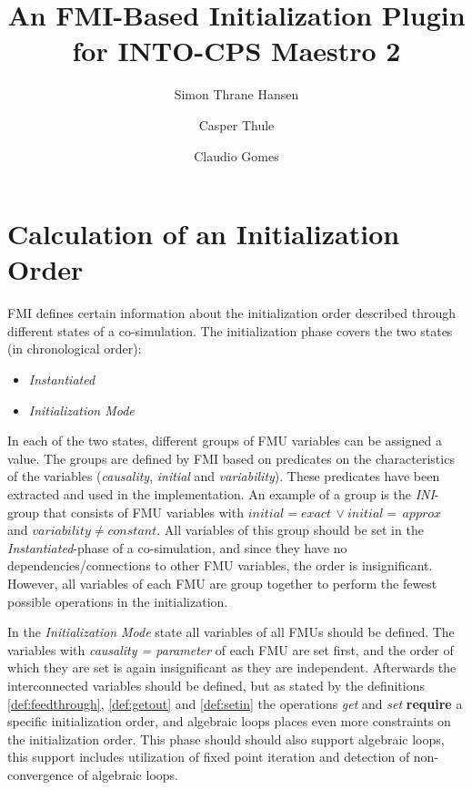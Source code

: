 \documentclass[runningheads]{llncs}
\begin{document}
%
\title{An FMI-Based Initialization Plugin for INTO-CPS Maestro 2}
%
%
\author{Simon Thrane Hansen \and
Casper Thule \and
Claudio Gomes }
%
%
%
\maketitle              %
%






\section{Calculation of an Initialization Order}\label{sc:initilization}
FMI defines certain information about the initialization order described through different states of a co-simulation. The initialization phase covers the two states (in chronological order):
\begin{itemize}
    \item \textit{Instantiated}
    \item \textit{Initialization Mode}
\end{itemize}
In each of the two states, different groups of FMU variables can be assigned a value. The groups are defined by FMI based on predicates on the characteristics of the variables (\textit{causality}, \textit{initial} and \textit{variability}). These predicates have been extracted and used in the implementation. 
An example of a group is the \textit{INI}-group that consists of FMU variables with $initial = exact\, \lor initial = \,approx $  and $variability \neq constant$. All variables of this group should be set in the \textit{Instantiated}-phase of a co-simulation, and since they have no dependencies/connections to other FMU variables, the order is insignificant. However, all variables of each FMU are group together to perform the fewest possible operations in the initialization. 

In the \textit{Initialization Mode} state all variables of all FMUs should be defined.
The variables with \textit{causality = parameter} of each FMU are set first, and the order of which they are set is again insignificant as they are independent.
Afterwards the interconnected variables should be defined, but as stated by the definitions \ref{def:feedthrough}, \ref{def:getout} and \ref{def:setin} the operations \textit{get} and \textit{set} \textbf{require} a specific initialization order, and algebraic loops places even more constraints on the initialization order. This phase should should also support algebraic loops, this support includes utilization of fixed point iteration and detection of non-convergence of algebraic loops.
\end{document}
